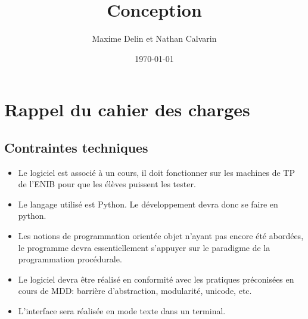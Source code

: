 \documentclass{article}
\title{Conception}
\author{Maxime Delin et Nathan Calvarin}
\date{\today}
\begin{document}
    \maketitle
    \newpage
    \tableofcontents
    \newpage
    
    \section{Rappel du cahier des charges}
        \subsection{Contraintes techniques}
        \begin{itemize}
        \item Le logiciel est associé à un cours, il doit fonctionner sur les machines de TP de l'ENIB pour que les élèves puissent les tester.
        \item Le langage utilisé est Python. Le développement devra donc se faire en python.
        \item Les notions de programmation orientée objet n'ayant pas encore été abordées, le programme devra essentiellement s'appuyer sur le paradigme de la programmation procédurale.
        \item Le logiciel devra être réalisé en conformité avec les pratiques préconisées en cours de MDD: barrière d'abstraction, modularité, unicode, etc.
        \item L'interface sera réalisée en mode texte dans un terminal.
        \end{itemize}
\end{document}
